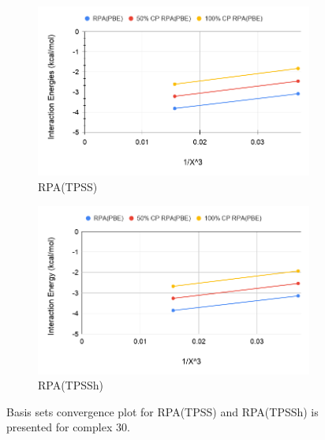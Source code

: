 \documentclass[11pt]{article}
\begin{document}
\begin{figure}[hbpt]
  \centering
  \begin{subfigure}{.5\textwidth}
    \center
    \includegraphics[scale=0.3]{tpss_30.png}
    \caption{RPA(TPSS)}
    \label{fig:tpss_30}
  \end{subfigure}%
  \begin{subfigure}{.5\textwidth}
    \center
    \includegraphics[scale=0.3]{tpssh_30.png}
    \caption{RPA(TPSSh)}
    \label{fig:tpssh_30}
  \end{subfigure}
  \caption{Basis sets convergence plot for RPA(TPSS) and RPA(TPSSh) is
    presented for complex 30.}
  \label{fig:complex_30}
\end{figure}
\end{document}
